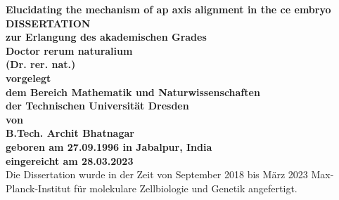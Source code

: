 \documentclass[
    BCOR=6mm,
    DIV=13,
    draft=false,
    titlepage=true,
    twoside=false,
    toc=bib,
    parskip=half-,
    chapterprefix=true,
    appendixprefix=true,
    footnotes=multiple,
    headsepline=true]{scrreprt}
\begin{document}

\begin{titlepage}
\vspace{1cm} 
\begin{center} 
    \Huge \textbf{Elucidating the mechanism of \acs{ap} axis alignment in the \acs{ce} embryo} \vspace{1cm}\\
    \Large \textbf{DISSERTATION \vspace{0.5cm}\\zur Erlangung des akademischen Grades \vspace{0.5cm}\\Doctor rerum naturalium \\(Dr. rer. nat.) \vspace{0.5cm}\\
    vorgelegt \vspace{0.5cm}\\dem Bereich Mathematik und Naturwissenschaften \\ der Technischen Universität Dresden\vspace{0.3cm} \\ von \vspace{0.3cm}\\
    B.Tech. Archit Bhatnagar \vspace{0.5cm}\\ geboren am 27.09.1996 in Jabalpur, India \vspace{0.5cm}\\ eingereicht am 28.03.2023\vspace{5mm}} \vspace{\fill}\\
    Die Dissertation wurde in der Zeit von September 2018 bis M{\"a}rz 2023 Max-Planck-Institut f{\"u}r molekulare Zellbiologie und Genetik angefertigt.
\end{center}
\clearpage
\thispagestyle{plain}
\hspace{\fill}{\huge To my parents and sister...}
\vspace*{\fill}
\end{titlepage}

\pagestyle{scrheadings}



\end{document}

